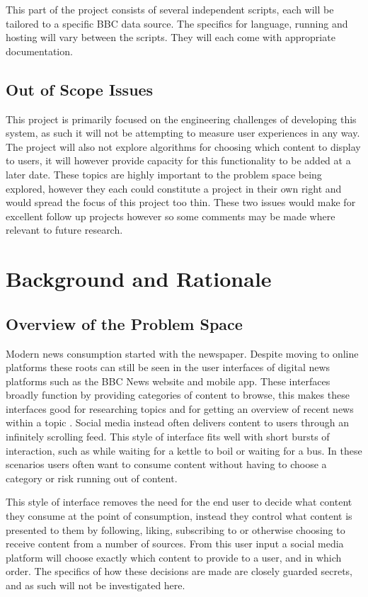 \documentclass[12pt,titlepage]{article}
\begin{document}
    This part of the project consists of several independent scripts, each will
    be tailored to a specific BBC data source. The specifics for language,
    running and hosting will vary between the scripts. They will each come with
    appropriate documentation.

  \subsection{Out of Scope Issues}

  This project is primarily focused on the engineering challenges of developing
  this system, as such it will not be attempting to measure user experiences in
  any way. The project will also not explore algorithms for choosing which
  content to display to users, it will however provide capacity for this
  functionality to be added at a later date. These topics are highly important
  to the problem space being explored, however they each could constitute a
  project in their own right and would spread the focus of this project too
  thin. These two issues would make for excellent follow up projects however so
  some comments may be made where relevant to future research.

\section{Background and Rationale}

  \subsection{Overview of the Problem Space}

  Modern news consumption started with the newspaper. Despite moving to online
  platforms these roots can still be seen in the user interfaces of digital news
  platforms such as the BBC News website and mobile app. These interfaces
  broadly function by providing categories of content to browse, this makes
  these interfaces good for researching topics and for getting an overview of
  recent news within a topic \cite{dummy}. Social media instead often delivers
  content to users through an infinitely scrolling feed. This style of interface
  fits well with short bursts of interaction, such as while waiting for a kettle
  to boil or waiting for a bus. In these scenarios users often want to consume
  content without having to choose a category or risk running out of content.

  This style of interface removes the need for the end user to decide what
  content they consume at the point of consumption, instead they control what
  content is presented to them by following, liking, subscribing to or otherwise
  choosing to receive content from a number of sources. From this user input a
  social media platform will choose exactly which content to provide to a user,
  and in which order. The specifics of how these decisions are made are closely
  guarded secrets, and as such will not be investigated here.
\end{document}
